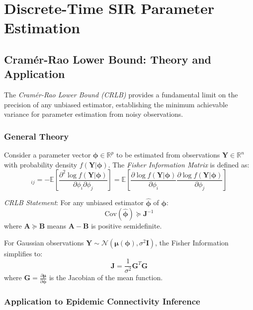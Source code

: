 \section{Discrete-Time SIR Parameter Estimation}

\subsection{Cramér-Rao Lower Bound: Theory and Application}

The \emph{Cramér-Rao Lower Bound (CRLB)} provides a fundamental limit on the precision of any unbiased estimator, establishing the minimum achievable variance for parameter estimation from noisy observations.

\subsubsection{General Theory}

Consider a parameter vector $\boldsymbol{\phi} \in \mathbb{R}^p$ to be estimated from observations $\mathbf{Y} \in \mathbb{R}^n$ with probability density $f(\mathbf{Y}|\boldsymbol{\phi})$. The \emph{Fisher Information Matrix} is defined as:
\begin{equation}
[\mathbf{J}]_{ij} = -\mathbb{E}\left[\frac{\partial^2 \log f(\mathbf{Y}|\boldsymbol{\phi})}{\partial \phi_i \partial \phi_j}\right] = \mathbb{E}\left[\frac{\partial \log f(\mathbf{Y}|\boldsymbol{\phi})}{\partial \phi_i}\frac{\partial \log f(\mathbf{Y}|\boldsymbol{\phi})}{\partial \phi_j}\right]
\end{equation}

\emph{CRLB Statement}: For any unbiased estimator $\hat{\boldsymbol{\phi}}$ of $\boldsymbol{\phi}$:
\begin{equation}
\text{Cov}(\hat{\boldsymbol{\phi}}) \succeq \mathbf{J}^{-1}
\end{equation}
where $\mathbf{A} \succeq \mathbf{B}$ means $\mathbf{A} - \mathbf{B}$ is positive semidefinite.

For Gaussian observations $\mathbf{Y} \sim \mathcal{N}(\boldsymbol{\mu}(\boldsymbol{\phi}), \sigma^2 \mathbf{I})$, the Fisher Information simplifies to:
\begin{equation}
\mathbf{J} = \frac{1}{\sigma^2} \mathbf{G}^T \mathbf{G}
\end{equation}
where $\mathbf{G} = \frac{\partial \boldsymbol{\mu}}{\partial \boldsymbol{\phi}}$ is the Jacobian of the mean function.

\subsubsection{Application to Epidemic Connectivity Inference}

